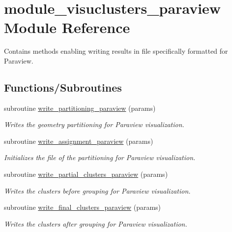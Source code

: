 \hypertarget{namespacemodule__visuclusters__paraview}{}\section{module\+\_\+visuclusters\+\_\+paraview Module Reference}
\label{namespacemodule__visuclusters__paraview}


Contains methods enabling writing results in file specifically formatted for Paraview.  


\subsection*{Functions/\+Subroutines}
\begin{DoxyCompactItemize}
\item 
subroutine \hyperlink{namespacemodule__visuclusters__paraview_a57010b34c7586dcf52fb9f50e2e1d7aa}{write\+\_\+partitioning\+\_\+paraview} (params)
\begin{DoxyCompactList}\small\item\em Writes the geometry partitioning for Paraview visualization. \end{DoxyCompactList}\item 
subroutine \hyperlink{namespacemodule__visuclusters__paraview_ad93eb4e679b429c757fcbf8831469a91}{write\+\_\+assignment\+\_\+paraview} (params)
\begin{DoxyCompactList}\small\item\em Initializes the file of the partitioning for Paraview visualization. \end{DoxyCompactList}\item 
subroutine \hyperlink{namespacemodule__visuclusters__paraview_abed87b4c957689d9cfdc62811f3b213b}{write\+\_\+partial\+\_\+clusters\+\_\+paraview} (params)
\begin{DoxyCompactList}\small\item\em Writes the clusters before grouping for Paraview visualization. \end{DoxyCompactList}\item 
subroutine \hyperlink{namespacemodule__visuclusters__paraview_a7e7514cf4abb2a7e0a8fa1d23252811e}{write\+\_\+final\+\_\+clusters\+\_\+paraview} (params)
\begin{DoxyCompactList}\small\item\em Writes the clusters after grouping for Paraview visualization. \end{DoxyCompactList}\item 

\end{DoxyCompactItemize}
